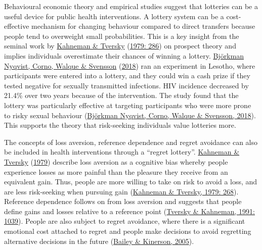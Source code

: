 \documentclass[11pt,preprint, authoryear]{elsarticle}
\numberwithin{equation}{section}
\numberwithin{figure}{section}
\numberwithin{table}{section}
\begin{document}
Behavioural economic theory and empirical studies suggest that lotteries
can be a useful device for public health interventions. A lottery system
can be a cost-effective mechanism for changing behaviour compared to
direct transfers because people tend to overweight small probabilities.
This is a key insight from the seminal work by
\protect\hyperlink{ref-prospect}{Kahneman \& Tversky}
(\protect\hyperlink{ref-prospect}{1979: 286}) on prospect theory and
implies individuals overestimate their chances of winning a lottery.
\protect\hyperlink{ref-hiv}{Björkman Nyqvist, Corno, Walque \& Svensson}
(\protect\hyperlink{ref-hiv}{2018}) ran an experiment in Lesotho, where
participants were entered into a lottery, and they could win a cash
prize if they tested negative for sexually transmitted infections. HIV
incidence decreased by 21.4\% over two years because of the
intervention. The study found that the lottery was particularly
effective at targeting participants who were more prone to risky sexual
behaviour (\protect\hyperlink{ref-hiv}{Björkman Nyqvist, Corno, Walque
\& Svensson, 2018}). This supports the theory that risk-seeking
individuals value lotteries more.

The concepts of loss aversion, reference dependence and regret avoidance
can also be included in health interventions through a ``regret
lottery''. \protect\hyperlink{ref-prospect}{Kahneman \& Tversky}
(\protect\hyperlink{ref-prospect}{1979}) describe loss aversion as a
cognitive bias whereby people experience losses as more painful than the
pleasure they receive from an equivalent gain. Thus, people are more
willing to take on risk to avoid a loss, and are less risk-seeking when
pursuing gain (\protect\hyperlink{ref-prospect}{Kahneman \& Tversky,
1979: 268}). Reference dependence follows on from loss aversion and
suggests that people define gains and losses relative to a reference
point (\protect\hyperlink{ref-ref}{Tversky \& Kahneman, 1991: 1039}).
People are also subject to regret avoidance, where there is a
significant emotional cost attached to regret and people make decisions
to avoid regretting alternative decisions in the future
(\protect\hyperlink{ref-regret}{Bailey \& Kinerson, 2005}).
\end{document}
